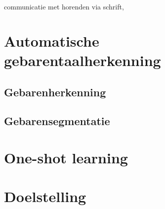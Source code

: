 communicatie met horenden via schrift, 
\section{Automatische gebarentaalherkenning}
\subsection{Gebarenherkenning}
\subsection{Gebarensegmentatie}
\section{One-shot learning}
\section{Doelstelling}